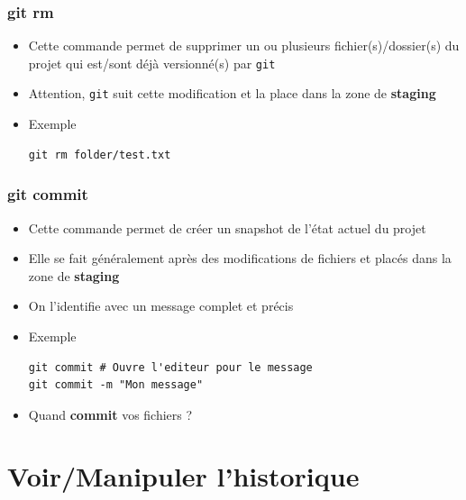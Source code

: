 \documentclass{beamer}
\begin{document}
\begin{frame}[fragile]
\frametitle{git rm}

\begin{itemize}
\item Cette commande permet de supprimer un ou plusieurs fichier(s)/dossier(s) du projet qui est/sont déjà versionné(s) par \texttt{git}
\item Attention, \texttt{git} suit cette modification et la place dans la zone de \textbf{staging}
\item Exemple
\begin{lstlisting}
git rm folder/test.txt
\end{lstlisting}
\end{itemize}
\end{frame}

\begin{frame}[fragile]
\frametitle{git commit}

\begin{itemize}
\item Cette commande permet de créer un snapshot de l'état actuel du projet
\item Elle se fait généralement après des modifications de fichiers et placés dans la zone de \textbf{staging}
\item On l'identifie avec un message complet et précis
\item Exemple
\begin{lstlisting}
git commit # Ouvre l'editeur pour le message
git commit -m "Mon message"
\end{lstlisting}
\item Quand \textbf{commit} vos fichiers ?
\end{itemize}
\end{frame}

\section{Voir/Manipuler l'historique}
\end{document}
